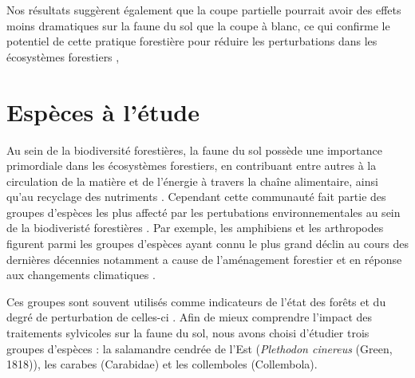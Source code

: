 Nos résultats suggèrent également que la coupe partielle pourrait avoir des effets moins dramatiques sur la faune du sol que la coupe à blanc, 
ce qui confirme le potentiel de cette pratique forestière pour réduire les perturbations dans les écosystèmes forestiers \citep{Kudrin2023metaanalysiseffects},




\section*{Espèces à l'étude}
\label{sec:species}


  


Au sein de la biodiversité forestières, la faune du sol possède une importance primordiale dans les écosystèmes forestiers, en contribuant entre autres à la circulation de la matière et de l'énergie à travers la chaîne alimentaire, ainsi qu'au recyclage des nutriments \citep{Seibold2021contributioninsects,Kudrin2023metaanalysiseffects}.
Cependant cette communauté fait partie des groupes d'espèces les plus affecté par les pertubations environnementales au sein de la biodiveristé forestières \citep{Marshall2000Impactsforest,Coyle2017Soilfauna}. 
Par exemple, les amphibiens et les arthropodes figurent parmi les groupes d'espèces ayant connu le plus grand déclin au cours des dernières décennies notamment a cause de l'aménagement forestier et en réponse aux changements climatiques \citep{Houlahan2000Quantitativeevidence,Stuart2004Statustrends,Warren2018projectedeffect,Wagner2021Insectdecline}. 

Ces groupes sont souvent utilisés comme indicateurs de l'état des forêts et du degré de perturbation de celles-ci \citep{pongeVerticalDistributionCollembola2000,birdChangesSoilLitter2004,Maleque2009Arthropodsbioindicators}.
Afin de mieux comprendre l'impact des traitements sylvicoles sur la faune du sol, nous avons choisi d'étudier trois groupes d'espèces : la salamandre cendrée de l'Est (\textit{Plethodon cinereus} (Green, 1818)), 
les carabes (Carabidae) et les collemboles (Collembola).


